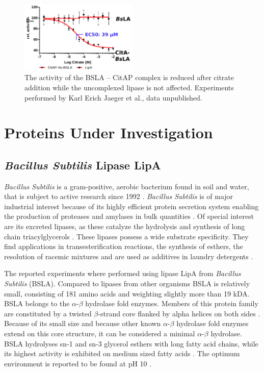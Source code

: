 \documentclass[english, a4paper, 12pt, titlepage, draft]{article}
\begin{document}
\begin{figure}
    \centering
    \includegraphics[width=0.5\textwidth]{figures/BSLA_activity/BSLA_activity.png}
    \caption{The activity of the BSLA -- CitAP complex is reduced after citrate addition while the uncomplexed lipase is not affected. Experiments performed by Karl Erich Jaeger et al., data unpublished.}
    \label{fig:BSLAactivity}
\end{figure}



\section{Proteins Under Investigation}


\subsection{\textit{Bacillus Subtilis} Lipase LipA}

\textit{Bacillus Subtilis} is a gram-positive, aerobic bacterium found in soil and water, that is subject to active research since 1992 \cite{bacillusSubtilis}.
\textit{Bacillus Subtilis} is of major industrial interest because of its highly efficient protein secretion system \cite{BSsecretion} enabling the production of proteases and amylases in bulk quantities \cite{BSworkhorse}.
Of special interest are its excreted lipases, as these catalyze the hydrolysis and synthesis of long chain triacylglycerols \cite{BSLA_1I6W}.
These lipases possess a wide substrate specificity.
They find applications in transesterification reactions, the synthesis of esthers, the resolution of racemic mixtures and are used as additives in laundry detergents \cite{BSdetergents}.

The reported experiments where performed using lipase LipA from \textit{Bacillus Subtilis} (BSLA).
Compared to lipases from other organisms BSLA is relatively small, consisting of 181 amino acids and weighting slightly more than 19 kDA.
BSLA belongs to the $\alpha$-$\beta$ hydrolase fold enzymes.
Members of this protein family are constituted by a twisted $\beta$-strand core flanked by alpha helices on both sides \cite{alphaBetaHydrolases}.
Because of its small size and because other known $\alpha$-$\beta$ hydrolase fold enzymes extend on this core structure, it can be considered a minimal $\alpha$-$\beta$ hydrolase.
BSLA hydrolyses sn-1 and sn-3 glycerol esthers with long fatty acid chains, while its highest activity is exhibited on medium sized fatty acids \cite{BSLA_1I6W}.
The optimum environment is reported to be found at pH 10 \cite{BSLA_1I6W}.
\end{document}
